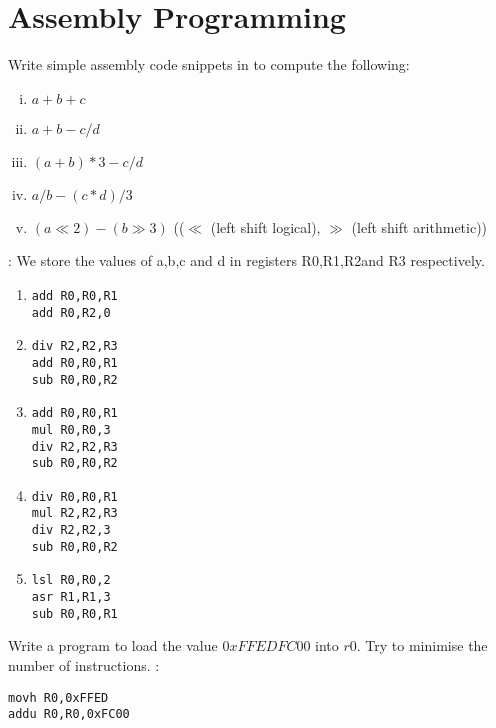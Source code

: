 \section*{Assembly Programming}

\begin{ExerciseList}

\Exercise Write simple assembly code snippets in \simplerisc to compute the following: 

\begin{enumerate}[i) ]
\item $a + b + c$
\item $a + b - c/d$
\item $(a + b)*3 - c/d$
\item $a/b - (c*d)/3$
\item $(a\ll2) - (b\gg 3)$ (($\ll$ (left shift logical), $\gg$ (left shift arithmetic))
\end{enumerate}

\Answer :
We store the values of a,b,c and d in registers R0,R1,R2and R3 respectively.\\
\begin{enumerate}
\item \begin{Verbatim}[frame=single]
add R0,R0,R1
add R0,R2,0
\end{Verbatim}
\item \begin{Verbatim}[frame=single]
div R2,R2,R3
add R0,R0,R1
sub R0,R0,R2
\end{Verbatim}
\item \begin{Verbatim}[frame=single]
add R0,R0,R1
mul R0,R0,3
div R2,R2,R3
sub R0,R0,R2
\end{Verbatim}
\item \begin{Verbatim}[frame=single]
div R0,R0,R1
mul R2,R2,R3
div R2,R2,3
sub R0,R0,R2
\end{Verbatim}
\item
\begin{Verbatim}[frame=single]
lsl R0,R0,2
asr R1,R1,3
sub R0,R0,R1
\end{Verbatim}
\end{enumerate}

\Exercise Write a program to load the value $0xFFEDFC00$ into $r0$. Try to minimise
the number of instructions.
\Answer :
\begin{Verbatim}
movh R0,0xFFED
addu R0,R0,0xFC00
\end{Verbatim}


\end{ExerciseList}
